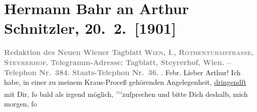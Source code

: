 

         
         \renewcommand{\erwaehntePersonen}{Personen: Hermann Bahr, Emerich von Bukovics, Karl Kraus}
         \renewcommand{\erwaehnteInstitutionen}{Institutionen: Neues Wiener Tagblatt}
         \renewcommand{\erwaehnteOrte}{Orte: Ober Sankt Veit, Steyrerhof, Wien}
         \renewcommand{\erwaehnteWerke}{}
               \section[Hermann Bahr an Arthur Schnitzler, 20. 2. {[}1901{]}]{ Hermann Bahr an Arthur Schnitzler, 20. 2. {[}1901{]}}\nopagebreak{}\rehead{ }\begin{ledgroupsized}[t]{13cm}\normalsize\beginnumbering \toendnotes[C]{\smallbreak\pagebreak[2]} 
\toendnotes[C]{\smallbreak}\pstart
           \noindent{}\centering{}{\pb}\textcolor{gray}{\textbf{Redaktion des Neuen Wiener Tagblatt}}\pend
           \pstart
           \noindent{}\centering{}\textcolor{gray}{\textbf{\textsc{Wien, I., Rothenturmstrasse,
                        Steyrerhof.}}}\pend
           \pstart
           \noindent{}\centering{}\textcolor{gray}{\textbf{Telegramm-Adresse: Tagblatt, Steyrerhof, Wien. –
                     Telephon Nr. 384. Staats-Telephon Nr. 36.}}\pend
           . Febr.\pend
           \pstart\center{}Lieber Arthur!\pend\pstart
           Ich habe, in einer zu meinem Kraus-Proceß
               gehörenden Angelegenheit, \uline{dringendſt} mit Dir, ſo bald
               als irgend möglich, \substVorne{}\textsuperscript{\textcolor{gray}{mi}}\substDazwischen{}zu\substHinten{}{ }ſprechen und bitte Dich deshalb, mich morgen, ſo

\end{ledgroupsized}
